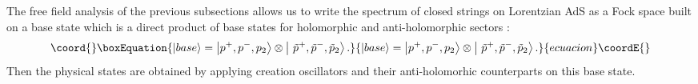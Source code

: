 \documentclass[a4paper,12pt]{article}
\begin{document}
The free field analysis of the previous subsections allows us to write the
spectrum of closed strings on Lorentzian AdS\coordHE{} as a Fock space built on
a base state which is a direct product of base states for holomorphic and
anti-holomorphic sectors \cite{bars1}:
\begin{equation}\coord{}\boxEquation{
\left| base\right\rangle =\left| p^{+},p^{-},p_{2}\right\rangle \otimes
\left| \ \tilde{p}^{+},\tilde{p}^{-},\tilde{p}_{2}\right\rangle .
\label{base1}
}{
\left| base\right\rangle =\left| p^{+},p^{-},p_{2}\right\rangle \otimes
\left| \ \tilde{p}^{+},\tilde{p}^{-},\tilde{p}_{2}\right\rangle .
}{ecuacion}\coordE{}\end{equation}
Then the physical states are obtained by applying creation oscillators \coordHE{} and their
anti-holomorhic counterparts on this base state.
\end{document}

